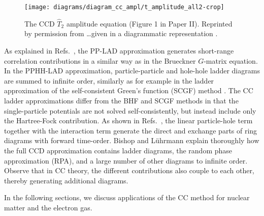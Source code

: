 \documentclass[a4paper,12pt]{report}
\begin{document}
\begin{figure} 
  \centering
  \texttt{[image: diagrams/diagram\_cc\_ampl/t\_amplitude\_all2-crop]}
  \caption{The CCD $\hat{T}_{2}$ amplitude equation (Figure 1 in Paper II). Reprinted by permission from \dots given in a diagrammatic representation \cite{baardsen}.}
  \label{fig:ampl_cc}
\end{figure}

As explained in Refs.~\cite{bishop1978,baardsen}, the PP-LAD approximation 
generates short-range correlation contributions in a similar way as in 
the Brueckner $G$-matrix equation. In the PPHH-LAD approximation, 
particle-particle and hole-hole ladder diagrams are summed to infinite order, 
similarly as for example in the ladder approximation of the self-consistent 
Green's function (SCGF) method \cite{dickhoff2004}. The CC ladder 
approximations differ from the BHF and SCGF methods in that the 
single-particle potentials are not solved self-consistently,
but instead include only the Hartree-Fock contribution. As shown in
Refs.~\cite{freeman1977,bishop1978}, the linear particle-hole term
together with the interaction term generate the direct and exchange 
parts of ring diagrams with forward time-order. Bishop and L{\"u}hrmann 
\cite{bishop1978} explain thoroughly how the full CCD approximation contains 
ladder diagrams, the random phase approximation (RPA), and a large number
of other diagrams to infinite order. Observe that in CC theory, the different
contributions also couple to each other, thereby generating additional 
diagrams. 


 

In the following sections, we discuss applications of the CC 
method for nuclear matter and the electron gas.
\end{document}
